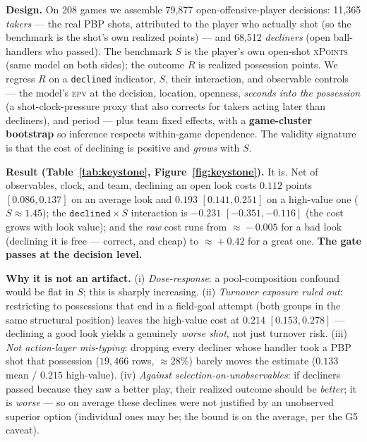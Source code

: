 \documentclass[11pt]{article}
\newcommand{\epv}{\textsc{epv}}
\newcommand{\xpts}{\textsc{xPoints}}
\begin{document}
\textbf{Design.} On 208 games we assemble 79{,}877 open-offensive-player decisions: 11{,}365 \emph{takers}
--- the real PBP shots, attributed to the player who actually shot (so the benchmark is the shot's own
realized points) --- and 68{,}512 \emph{decliners} (open ball-handlers who passed). The benchmark $S$ is
the player's own open-shot \xpts{} (same model on both sides); the outcome $R$ is realized possession
points. We regress $R$ on a \texttt{declined} indicator, $S$, their interaction, and observable controls
--- the model's \epv{} at the decision, location, openness, \emph{seconds into the possession}
(a shot-clock-pressure proxy that also corrects for takers acting later than decliners), and period ---
plus team fixed effects, with a \textbf{game-cluster bootstrap} so inference respects within-game
dependence. The validity signature is that the cost of declining is positive and \emph{grows} with $S$.

\textbf{Result (Table~\ref{tab:keystone}, Figure~\ref{fig:keystone}).} It is. Net of observables, clock,
and team, declining an open look costs $0.112$ points $[0.086,0.137]$ on an average look and $0.193$
$[0.141,0.251]$ on a high-value one ($S\!\approx\!1.45$); the $\texttt{declined}\times S$ interaction is
$-0.231$ $[-0.351,-0.116]$ (the cost grows with look value); and the \emph{raw} cost runs from
$\approx\!{-}0.005$ for a bad look (declining it is free --- correct, and cheap) to $\approx\!+0.42$ for a
great one. \textbf{The gate passes at the decision level.}

\textbf{Why it is not an artifact.} (i) \emph{Dose-response}: a pool-composition confound would be flat in
$S$; this is sharply increasing. (ii) \emph{Turnover exposure ruled out}: restricting to possessions that
end in a field-goal attempt (both groups in the same structural position) leaves the high-value cost at
$0.214$ $[0.153,0.278]$ --- declining a good look yields a genuinely \emph{worse shot}, not just turnover
risk. (iii) \emph{Not action-layer mis-typing}: dropping every decliner whose handler took a PBP shot that
possession ($19{,}466$ rows, $\approx\!28\%$) barely moves the estimate ($0.133$ mean / $0.215$
high-value). (iv) \emph{Against selection-on-unobservables}: if decliners passed because they saw a better
play, their realized outcome should be \emph{better}; it is \emph{worse} --- so on average these declines
were not justified by an unobserved superior option (individual ones may be; the bound is on the average,
per the G5 caveat).
\end{document}
